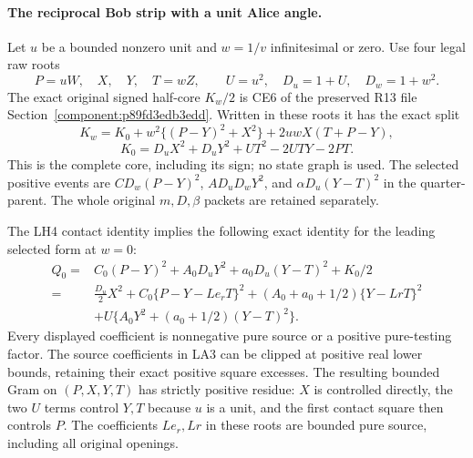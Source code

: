 \paragraph{The reciprocal Bob strip with a unit Alice angle.}
Let $u$ be a bounded nonzero unit and $w=1/v$ infinitesimal or zero.
Use four legal raw roots
\[
 P=uW,\quad X,\quad Y,\quad T=wZ,
 \qquad U=u^2,\quad D_u=1+U,\quad D_w=1+w^2.
\]
The exact original signed half-core $K_w/2$ is CE6 of the preserved
R13 file Section~\ref{component:p89fd3edb3edd}.
Written in these roots it has the exact split
\[
 K_w=K_0+w^2\{(P-Y)^2+X^2\}
                      +2uwX(T+P-Y),                         \tag{LA2}
\]
\[
 K_0=D_uX^2+D_uY^2+UT^2-2UTY-2PT.
\]
This is the complete core, including its sign; no state graph is used.
The selected positive events are
$CD_w(P-Y)^2$, $AD_uD_wY^2$, and
$\alpha D_u(Y-T)^2$ in the quarter-parent.  The whole original
$m,D,\beta$ packets are retained separately.

The LH4 contact identity implies the following exact identity for
the leading selected form at $w=0$:
\[
\begin{split}
 Q_0={}&C_0(P-Y)^2+A_0D_uY^2+a_0D_u(Y-T)^2+K_0/2\\
 ={}&\frac{D_u}{2}X^2
       +C_0\{P-Y-Le_rT\}^2
       +(A_0+a_0+1/2)\{Y-LrT\}^2\\
 &+U\{A_0Y^2+(a_0+1/2)(Y-T)^2\}.
\end{split}                                                   \tag{LA3}
\]
Every displayed coefficient is nonnegative pure source or a positive
pure-testing factor.  The source coefficients in LA3 can be clipped
at positive real lower bounds, retaining their exact positive square
excesses.  The resulting bounded Gram on $(P,X,Y,T)$ has strictly
positive residue: $X$ is controlled directly, the two $U$ terms
control $Y,T$ because $u$ is a unit, and the first contact square
then controls $P$.  The coefficients $Le_r,Lr$ in these roots are
bounded pure source, including all original openings.

